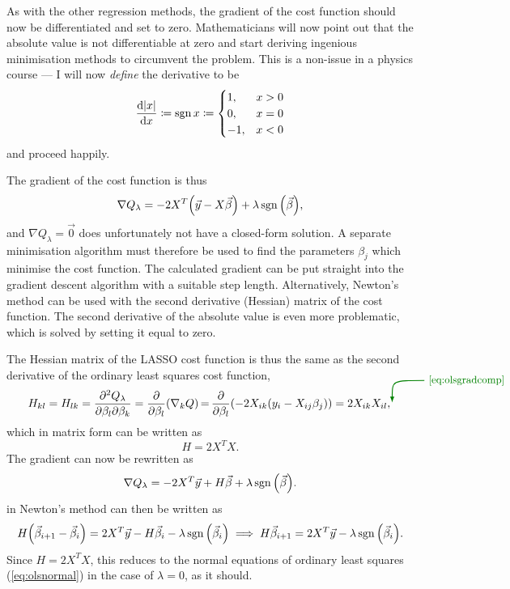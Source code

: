 \documentclass[11pt,british,a4paper]{article}
\newcommand{\husk}[2]{\tikz[baseline,remember picture,inner sep=0pt,outer sep=0pt]{\node[anchor=base] (#1) {\(#2\)};}}
\DeclareMathOperator{\sgn}{sgn}
\numberwithin{equation}{section}
\begin{document}
As with the other regression methods, the gradient of the cost function should now be differentiated and set to zero.
Mathematicians will now point out that the absolute value is not differentiable at zero and start deriving ingenious minimisation methods to circumvent the problem.
This is a non-issue in a physics course --- I will now \emph{define} the derivative to be
\begin{equation}
    \dv{\abs{x}}{x} \coloneqq \sgn{x} \coloneqq \begin{cases}1, & x > 0\\ 0, & x = 0 \\ -1, & x < 0 \end{cases}
\end{equation}
and proceed happily.

The gradient of the cost function is thus
\begin{equation}
    \nabla Q_\lambda = -2 X^T \qty(\vec{y} - X\vec{\beta}) + \lambda \sgn\qty(\vec{\beta}),
\end{equation}
and \(\nabla Q_\lambda = \vec{0}\) does unfortunately not have a closed-form solution.
A separate minimisation algorithm must therefore be used to find the parameters \(\beta_j\) which minimise the cost function.
The calculated gradient can be put straight into the gradient descent algorithm with a suitable step length.
Alternatively, Newton's method can be used with the second derivative (Hessian) matrix of the cost function.
The second derivative of the absolute value is even more problematic, which is solved by setting it equal to zero.

The Hessian matrix of the LASSO cost function is thus the same as the second derivative of the ordinary least squares cost function,
\begin{equation}
    H_{kl} = H_{lk} = \pdv{Q_\lambda}{\beta_l}{\beta_k}
           = \pdv{\beta_l}(\nabla_k Q)
           \,\husk{gradref}{=}\, \pdv{\beta_l}(-2X_{ik}\qty(y_i-X_{ij}\beta_j))
           = 2X_{ik}X_{il},
\tikz[>=latex,overlay,remember picture,thick]{\draw[<-,gronn] (gradref) .. controls ++(0,0.75) and ++(-1,0) .. ++(1,0.75) node[anchor=west] {\small\ref{eq:olsgradcomp}};}
\end{equation}
which in matrix form can be written as
\begin{equation}
    H = 2 X^T X.
\end{equation}
The gradient can now be rewritten as
\begin{equation}
    \nabla Q_\lambda = -2 X^T \vec{y} + H\vec{\beta} + \lambda \sgn\qty(\vec{\beta}).
\end{equation}
 in Newton's method can then be written as
\begin{equation}
    H\qty(\vec{\beta}_{i+1} - \vec{\beta}_i) = 2X^T \vec{y}  - H\vec{\beta}_i - \lambda \sgn\qty(\vec{\beta}_i)
    \implies H\vec{\beta}_{i+1} = 2X^T\vec{y} - \lambda \sgn\qty(\vec{\beta}_i).
\end{equation}
Since \(H=2X^T X\), this reduces to the normal equations of ordinary least squares (\vref*{eq:olsnormal}) in the case of \(\lambda=0\), as it should.
\end{document}
